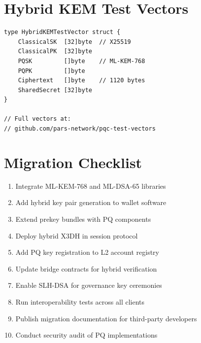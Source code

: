 \documentclass[11pt,a4paper]{article}
\begin{document}
\section{Hybrid KEM Test Vectors}
\label{app:vectors}

\begin{lstlisting}[caption={Test Vector Structure}]
type HybridKEMTestVector struct {
    ClassicalSK  [32]byte  // X25519
    ClassicalPK  [32]byte
    PQSK         []byte    // ML-KEM-768
    PQPK         []byte
    Ciphertext   []byte    // 1120 bytes
    SharedSecret [32]byte
}

// Full vectors at:
// github.com/pars-network/pqc-test-vectors
\end{lstlisting}

\section{Migration Checklist}
\label{app:checklist}

\begin{enumerate}
    \item Integrate ML-KEM-768 and ML-DSA-65 libraries
    \item Add hybrid key pair generation to wallet software
    \item Extend prekey bundles with PQ components
    \item Deploy hybrid X3DH in session protocol
    \item Add PQ key registration to L2 account registry
    \item Update bridge contracts for hybrid verification
    \item Enable SLH-DSA for governance key ceremonies
    \item Run interoperability tests across all clients
    \item Publish migration documentation for third-party developers
    \item Conduct security audit of PQ implementations
\end{enumerate}
\end{document}

